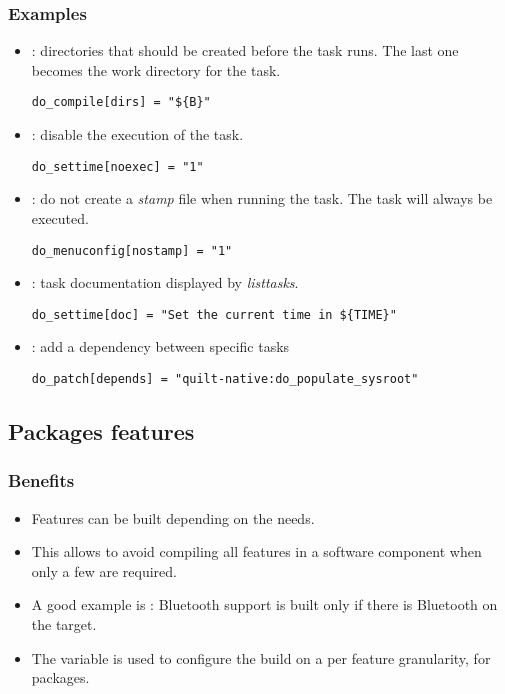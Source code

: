 \begin{frame}[fragile]
  \frametitle{Examples}
  \begin{itemize}
    \item {}: directories that should be created before the task
      runs. The last one becomes the work directory for the task.
      \begin{verbatim}
do_compile[dirs] = "${B}"
      \end{verbatim}
    \item {}: disable the execution of the task.
      \begin{verbatim}
do_settime[noexec] = "1"
      \end{verbatim}
    \item {}: do not create a {\em stamp} file when running the
      task. The task will always be executed.
      \begin{verbatim}
do_menuconfig[nostamp] = "1"
      \end{verbatim}
    \item {}: task documentation displayed by {\em listtasks}.
      \begin{verbatim}
do_settime[doc] = "Set the current time in ${TIME}"
      \end{verbatim}
    \item {}: add a dependency between specific tasks
      \begin{verbatim}
do_patch[depends] = "quilt-native:do_populate_sysroot"
      \end{verbatim}
  \end{itemize}
\end{frame}

\subsection{Packages features}

\begin{frame}
  \frametitle{Benefits}
  \begin{itemize}
    \item Features can be built depending on the needs.
    \item This allows to avoid compiling all features in a software
      component when only a few are required.
    \item A good example is : Bluetooth support
      is built only if there is Bluetooth on the target.
    \item The  variable is used to configure the
      build on a per feature granularity, for packages.
  \end{itemize}
\end{frame}

